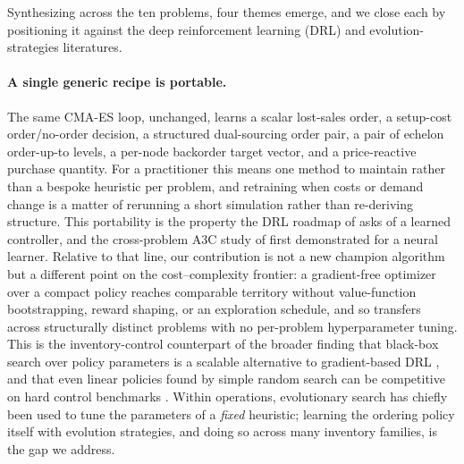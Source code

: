 \documentclass[11pt]{article}
\begin{document}
Synthesizing across the ten problems, four themes emerge, and we close each by positioning it against
the deep reinforcement learning (DRL) and evolution-strategies literatures.

\paragraph{A single generic recipe is portable.}
The same CMA-ES loop, unchanged, learns a scalar lost-sales order, a setup-cost order/no-order
decision, a structured dual-sourcing order pair, a pair of echelon order-up-to levels, a per-node
backorder target vector, and a price-reactive purchase quantity. For a practitioner this means one
method to maintain rather than a bespoke heuristic per problem, and retraining when costs or demand
change is a matter of rerunning a short simulation rather than re-deriving structure. This portability
is the property the DRL roadmap of \citet{boute2022deep} asks of a learned controller, and the
cross-problem A3C study of \citet{gijsbrechts2022drl} first demonstrated for a neural learner.
Relative to that line, our contribution is not a new champion algorithm but a different point on the
cost--complexity frontier: a gradient-free optimizer over a compact policy reaches comparable territory
without value-function bootstrapping, reward shaping, or an exploration schedule, and so transfers
across structurally distinct problems with no per-problem hyperparameter tuning. This is the
inventory-control counterpart of the broader finding that black-box search over policy parameters is a
scalable alternative to gradient-based DRL \citep{Salimans2017EvolutionLearning}, and that even
linear policies found by simple random search can be competitive on hard control benchmarks
\citep{mania2018ars}. Within operations, evolutionary search has chiefly been used to tune the
parameters of a \emph{fixed} heuristic; learning the ordering policy itself with evolution strategies,
and doing so across many inventory families, is the gap we address.
\end{document}
